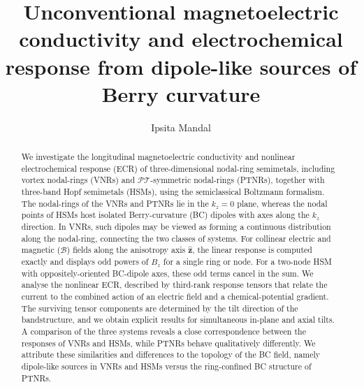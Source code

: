 \documentclass[aps,prb,onecolumn,nofootinbib,citeautoscript,10pt]{revtex4-2}
\begin{document}
\title{Unconventional magnetoelectric conductivity and electrochemical response from dipole-like sources of Berry curvature}



\author{Ipsita Mandal}


 
\begin{abstract} 
We investigate the longitudinal magnetoelectric conductivity and nonlinear electrochemical response (ECR) of three-dimensional nodal-ring semimetals, including vortex nodal-rings (VNRs) and $\mathcal{PT}$-symmetric nodal-rings (PTNRs), together with three-band Hopf semimetals (HSMs), using the semiclassical Boltzmann formalism. The nodal-rings of the VNRs and PTNRs lie in the $k_z=0$ plane, whereas the nodal points of HSMs host isolated Berry-curvature (BC) dipoles with axes along the $k_z$ direction. In VNRs, such dipoles may be viewed as forming a continuous distribution along the nodal-ring, connecting the two classes of systems. For collinear electric and magnetic ($\mathcal{B}$) fields along the anisotropy axis $\boldsymbol {\hat{z}}$, the linear response is computed exactly and displays odd powers of $B_z$ for a single ring or node. For a two-node HSM with oppositely-oriented BC-dipole axes, these odd terms cancel in the sum. We analyse the nonlinear ECR, described by third-rank response tensors that relate the current to the combined action of an electric field and a chemical-potential gradient. The surviving tensor components are determined by the tilt direction of the bandstructure, and we obtain explicit results for simultaneous in-plane and axial tilts. A comparison of the three systems reveals a close correspondence between the responses of VNRs and HSMs, while PTNRs behave qualitatively differently. We attribute these similarities and differences to the topology of the BC field, namely dipole-like sources in VNRs and HSMs versus the ring-confined BC structure of PTNRs.
\end{abstract}

\maketitle
\tableofcontents
\end{document}
